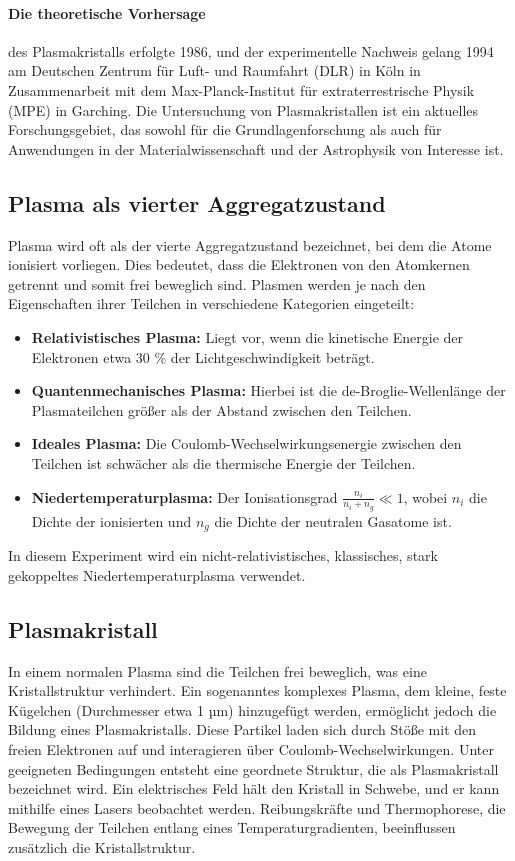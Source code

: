 \documentclass[12pt,a4paper,ngerman]{article}
\begin{document}
\paragraph*{Die theoretische Vorhersage} des Plasmakristalls erfolgte 1986, und der experimentelle Nachweis gelang 1994 am Deutschen Zentrum für Luft- und Raumfahrt (DLR) in Köln in Zusammenarbeit mit dem Max-Planck-Institut für extraterrestrische Physik (MPE) in Garching. Die Untersuchung von Plasmakristallen ist ein aktuelles Forschungsgebiet, das sowohl für die Grundlagenforschung als auch für Anwendungen in der Materialwissenschaft und der Astrophysik von Interesse ist.

\subsection{Plasma als vierter Aggregatzustand}
Plasma wird oft als der vierte Aggregatzustand bezeichnet, bei dem die Atome ionisiert vorliegen. Dies bedeutet, dass die Elektronen von den Atomkernen getrennt und somit frei beweglich sind. Plasmen werden je nach den Eigenschaften ihrer Teilchen in verschiedene Kategorien eingeteilt:

\begin{itemize}
    \item \textbf{Relativistisches Plasma:} Liegt vor, wenn die kinetische Energie der Elektronen etwa 30 \% der Lichtgeschwindigkeit beträgt.
    \item \textbf{Quantenmechanisches Plasma:} Hierbei ist die de-Broglie-Wellenlänge der Plasmateilchen größer als der Abstand zwischen den Teilchen.
    \item \textbf{Ideales Plasma:} Die Coulomb-Wechselwirkungsenergie zwischen den Teilchen ist schwächer als die thermische Energie der Teilchen.
    \item \textbf{Niedertemperaturplasma:} Der Ionisationsgrad \( \frac{n_i}{n_i + n_g} \ll 1 \), wobei \( n_i \) die Dichte der ionisierten und \( n_g \) die Dichte der neutralen Gasatome ist.
\end{itemize}

In diesem Experiment wird ein nicht-relativistisches, klassisches, stark gekoppeltes Niedertemperaturplasma verwendet.

\subsection{Plasmakristall}
In einem normalen Plasma sind die Teilchen frei beweglich, was eine Kristallstruktur verhindert. Ein sogenanntes komplexes Plasma, dem kleine, feste Kügelchen (Durchmesser etwa 1 µm) hinzugefügt werden, ermöglicht jedoch die Bildung eines Plasmakristalls. Diese Partikel laden sich durch Stöße mit den freien Elektronen auf und interagieren über Coulomb-Wechselwirkungen. Unter geeigneten Bedingungen entsteht eine geordnete Struktur, die als Plasmakristall bezeichnet wird. Ein elektrisches Feld hält den Kristall in Schwebe, und er kann mithilfe eines Lasers beobachtet werden. Reibungskräfte und Thermophorese, die Bewegung der Teilchen entlang eines Temperaturgradienten, beeinflussen zusätzlich die Kristallstruktur.
\end{document}
